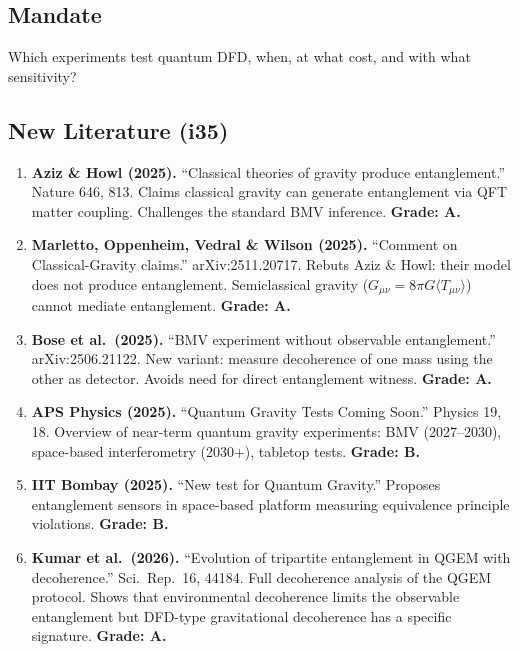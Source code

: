 \documentclass[11pt,a4paper]{article}
\begin{document}
\subsection{Mandate}

Which experiments test quantum DFD, when, at what cost, and with what sensitivity?

\subsection{New Literature (i35)}

\begin{enumerate}
\item \textbf{Aziz \& Howl (2025).} ``Classical theories of gravity produce entanglement.'' Nature 646, 813. Claims classical gravity can generate entanglement via QFT matter coupling. Challenges the standard BMV inference. \textbf{Grade: A.}

\item \textbf{Marletto, Oppenheim, Vedral \& Wilson (2025).} ``Comment on Classical-Gravity claims.'' arXiv:2511.20717. Rebuts Aziz \& Howl: their model does not produce entanglement. Semiclassical gravity ($G_{\mu\nu} = 8\pi G\langle T_{\mu\nu}\rangle$) cannot mediate entanglement. \textbf{Grade: A.}

\item \textbf{Bose et al.\ (2025).} ``BMV experiment without observable entanglement.'' arXiv:2506.21122. New variant: measure decoherence of one mass using the other as detector. Avoids need for direct entanglement witness. \textbf{Grade: A.}

\item \textbf{APS Physics (2025).} ``Quantum Gravity Tests Coming Soon.'' Physics 19, 18. Overview of near-term quantum gravity experiments: BMV (2027--2030), space-based interferometry (2030+), tabletop tests. \textbf{Grade: B.}

\item \textbf{IIT Bombay (2025).} ``New test for Quantum Gravity.'' Proposes entanglement sensors in space-based platform measuring equivalence principle violations. \textbf{Grade: B.}

\item \textbf{Kumar et al.\ (2026).} ``Evolution of tripartite entanglement in QGEM with decoherence.'' Sci.\ Rep.\ 16, 44184. Full decoherence analysis of the QGEM protocol. Shows that environmental decoherence limits the observable entanglement but DFD-type gravitational decoherence has a specific signature. \textbf{Grade: A.}
\end{enumerate}
\end{document}
